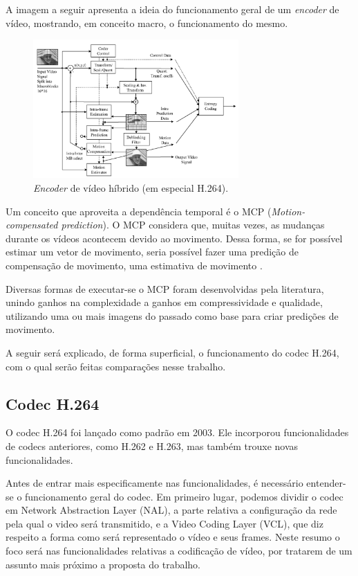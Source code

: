 \documentclass[cic,tc]{iiufrgs}
\begin{document}
A imagem a seguir apresenta a ideia do funcionamento geral de um \textit{encoder} de vídeo,
mostrando, em conceito macro, o funcionamento do mesmo.
\begin{figure}[H]
    \caption{\textit{Encoder} de vídeo híbrido (em especial H.264).}
    \begin{center}
        \includegraphics[width=0.7\textwidth]{img/HybridCodec.png}
    \end{center}
\end{figure}

Um conceito que aproveita a dependência temporal é o MCP (\textit{Motion-compensated prediction}).
O MCP considera que, muitas vezes, as mudanças durante os vídeos acontecem devido ao movimento.
Dessa forma, se for possível estimar um vetor de movimento, seria possível fazer uma predição
de compensação de movimento, uma estimativa de movimento \cite{SullivanH264}. 

Diversas formas de executar-se o MCP foram desenvolvidas pela literatura, unindo ganhos
na complexidade a ganhos em compressividade e qualidade, utilizando uma ou mais imagens 
do passado como base para criar predições de movimento.

A seguir será explicado, de forma superficial, o funcionamento do codec H.264, com o qual 
serão feitas comparações nesse trabalho.

\subsection{Codec H.264}
O codec H.264 foi lançado como padrão em 2003.
Ele incorporou funcionalidades de codecs anteriores, como H.262 e H.263, mas também
trouxe novas funcionalidades.

Antes de entrar mais especificamente nas funcionalidades, é necessário entender-se o 
funcionamento geral do codec.
Em primeiro lugar, podemos dividir o codec em Network Abstraction Layer (NAL), a parte
relativa a configuração da rede pela qual o video será transmitido,
e a Video Coding Layer (VCL), que diz respeito a forma como será representado o vídeo 
e seus frames.
Neste resumo o foco será nas funcionalidades relativas a codificação de vídeo, 
por tratarem de um assunto mais próximo a proposta do trabalho.
\end{document}
